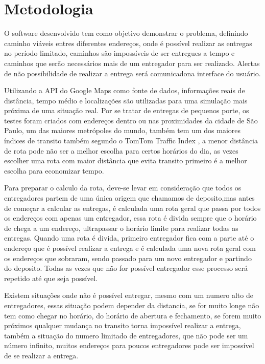 \chapter{Metodologia}
O software desenvolvido tem como objetivo demonstrar o problema, definindo caminho viáveis entres diferentes endereços, onde é possível realizar as entregas no período limitado, caminhos são impossíveis de ser entregues a tempo e caminhos que serão necessários mais de um entregador para ser realizado. Alertas de não possibilidade de realizar a entrega será comunicadona interface do usuário.

Utilizando a API do Google Maps como fonte de dados, informações reais de distância, tempo médio e localizações são utilizadas para uma simulação mais próxima de uma situação real.
Por se tratar de entregas de pequenos porte, os testes foram criados com endereços dentro ou nas proximidades da cidade de São Paulo, um das maiores metrópoles do mundo, também tem um dos maiores índices de transito também segundo o TomTom Traffic Index \cite{TomTom}, a menor distância de rota pode não ser a melhor escolha para certos horários do dia, as vezes escolher uma rota com maior distância que evita transito primeiro é a melhor escolha para economizar tempo.

Para preparar o calculo da rota, deve-se levar em consideração que todos os entregadores partem de uma única origem que chamamos de deposito,mas antes de começar a calcular as entregas, é calculada uma rota geral que passa por todos os endereços com apenas um entregador, essa rota é divida sempre que o horário de chega a um endereço, ultrapassar o horário limite para realizar todas as entregas. Quando uma rota é divida, primeiro entregador fica com a parte até o endereço que é possível realizar a entrega e é calculada uma nova rota geral com os endereços que sobraram, sendo passado para um novo entregador e partindo do deposito. Todas as vezes que não for possível entregador esse processo será repetido até que seja possível.

Existem situações onde não é possível entregar, mesmo com um numero alto de entregadores, essas situação podem depender da distancia, se for muito longe não tem como chegar no horário, do horário de abertura e fechamento, se forem muito próximos qualquer mudança no transito torna impossível realizar a entrega, também a situação do numero limitado de entregadores, que não pode ser um número infinito, muitos endereços para poucos entregadores pode ser impossível de se realizar a entrega.

